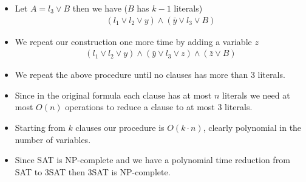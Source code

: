 \documentclass{beamer}
\begin{document}
\begin{frame}
  \begin{itemize}
  \item Let $A=l_3\vee B$ then we have ($B$ has $k-1$ literals)
    \begin{align*}
      (l_1\vee l_2\vee y)\wedge (\bar{y}\vee l_3\vee B)
    \end{align*}
  \item We repeat our construction one more time by adding a variable $z$
    \begin{align*}
      (l_1\vee l_2\vee y)\wedge (\bar{y}\vee l_3\vee z)\wedge (\bar{z}\vee B)
    \end{align*}
  \end{itemize}
\end{frame}



\begin{frame}
  \begin{itemize}
  \item We repeat the above procedure until no clauses has more than 3 literals.
  \item Since in the original formula each clause has at most $n$ literals we need at most $O(n)$ operations to reduce a clause to at most 3 literals.
  \item Starting from $k$ clauses our procedure is $O(k\cdot n)$, clearly polynomial in the number of variables.
  \item Since SAT is NP-complete and we have a polynomial time reduction from SAT to 3SAT then 3SAT is NP-complete.
  \end{itemize}
\end{frame}
\end{document}
